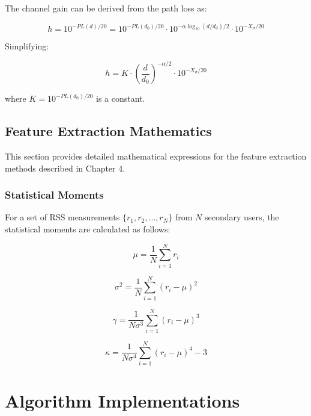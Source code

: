 The channel gain can be derived from the path loss as:

\begin{equation}
    h = 10^{-PL(d)/20} = 10^{-PL(d_0)/20} \cdot 10^{-\alpha\log_{10}(d/d_0)/2} \cdot 10^{-X_\sigma/20}
\end{equation}

Simplifying:

\begin{equation}
    h = K \cdot \left(\frac{d}{d_0}\right)^{-\alpha/2} \cdot 10^{-X_\sigma/20}
\end{equation}

where $K = 10^{-PL(d_0)/20}$ is a constant.

\subsection{Feature Extraction Mathematics}
\label{app:feature_math}

This section provides detailed mathematical expressions for the feature extraction methods described in Chapter 4.

\subsubsection{Statistical Moments}

For a set of RSS measurements $\{r_1, r_2, \ldots, r_N\}$ from $N$ secondary users, the statistical moments are calculated as follows:

\begin{equation}
    \mu = \frac{1}{N}\sum_{i=1}^{N} r_i
\end{equation}

\begin{equation}
    \sigma^2 = \frac{1}{N}\sum_{i=1}^{N} (r_i - \mu)^2
\end{equation}

\begin{equation}
    \gamma = \frac{1}{N\sigma^3}\sum_{i=1}^{N} (r_i - \mu)^3
\end{equation}

\begin{equation}
    \kappa = \frac{1}{N\sigma^4}\sum_{i=1}^{N} (r_i - \mu)^4 - 3
\end{equation}

\section{Algorithm Implementations}

